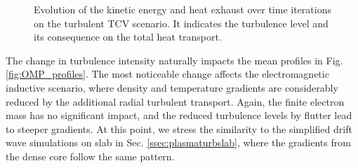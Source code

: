 \begin{figure}[H]
\begin{subfigure}[t]{0.45\textwidth}
		\label{fig:HeatExhaust}
	\end{subfigure}
	\caption{Evolution of the kinetic energy and heat exhaust over time iterations on the turbulent TCV scenario. It indicates the turbulence level and its consequence on the total heat transport.}
	\label{fig:plasmaEvolution}
\end{figure}

The change in turbulence intensity naturally impacts the mean profiles in Fig. \ref{fig:OMP_profiles}. The most noticeable change affects the electromagnetic inductive scenario, where density and temperature gradients are considerably reduced by the additional radial turbulent transport. Again, the finite electron mass has no significant impact, and the reduced turbulence levels by flutter lead to steeper gradients. At this point, we stress the similarity to the simplified drift wave simulations on slab in Sec. \ref{ssec:plasmaturbslab}, where the gradients from the dense core follow the same pattern. \newline

